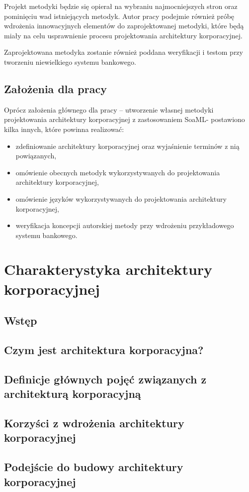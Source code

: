 Projekt metodyki będzie się opierał na wybraniu najmocniejszych stron oraz pominięciu wad istniejących metodyk. Autor pracy podejmie również próbę wdrożenia innowacyjnych elementów do zaprojektowanej metodyki, które będą miały na celu usprawnienie procesu projektowania architektury korporacyjnej.

Zaprojektowana metodyka zostanie również poddana weryfikacji i testom przy tworzeniu niewielkiego systemu bankowego.

\section{Założenia dla pracy}
Oprócz założenia głównego dla pracy – utworzenie własnej metodyki projektowania architektury korporacyjnej z zastosowaniem SoaML- postawiono kilka innych, które powinna realizować:
\begin{itemize}
\item{zdefiniowanie architektury korporacyjnej oraz wyjaśnienie terminów z nią powiązanych,}
\item{omówienie obecnych metodyk wykorzystywanych do projektowania architektury korporacyjnej,}
\item{omówienie języków wykorzystywanych do projektowania architektury korporacyjnej,}
\item{weryfikacja koncepcji autorskiej metody przy wdrożeniu przykładowego systemu bankowego.}
\end{itemize}

\chapter{Charakterystyka architektury korporacyjnej}
\section{Wstęp}
\section{Czym jest architektura korporacyjna?}
\section{Definicje głównych pojęć związanych z architekturą korporacyjną}
\section{Korzyści z wdrożenia architektury korporacyjnej}
\section{Podejście do budowy architektury korporacyjnej}
